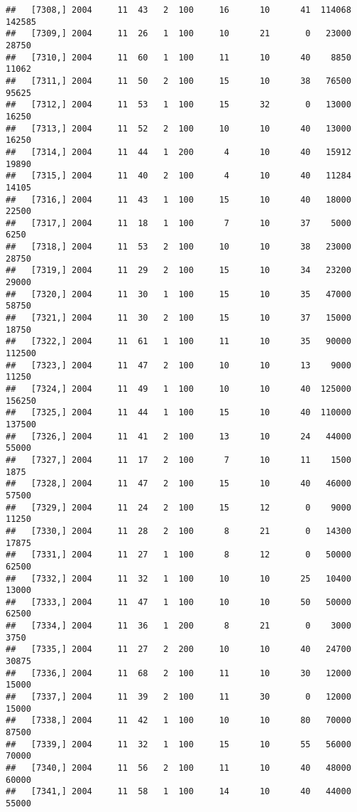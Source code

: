 \documentclass{article}\usepackage[]{graphicx}\usepackage[]{color}
\makeatletter
\newenvironment{kframe}{%
 \def\at@end@of@kframe{}%
 \ifinner\ifhmode%
  \def\at@end@of@kframe{\end{minipage}}%
  \begin{minipage}{\columnwidth}%
 \fi\fi%
 \def\FrameCommand##1{\hskip\@totalleftmargin \hskip-\fboxsep
 \colorbox{shadecolor}{##1}\hskip-\fboxsep
     \hskip-\linewidth \hskip-\@totalleftmargin \hskip\columnwidth}%
 \MakeFramed {\advance\hsize-\width
   \@totalleftmargin\z@ \linewidth\hsize
   \@setminipage}}%
 {\par\unskip\endMakeFramed%
 \at@end@of@kframe}
\newenvironment{knitrout}{}{} %
\makeatother
\begin{document}
\begin{knitrout}
\begin{kframe}
\begin{verbatim}
##   [7308,] 2004     11  43   2  100     16      10      41  114068  142585
##   [7309,] 2004     11  26   1  100     10      21       0   23000   28750
##   [7310,] 2004     11  60   1  100     11      10      40    8850   11062
##   [7311,] 2004     11  50   2  100     15      10      38   76500   95625
##   [7312,] 2004     11  53   1  100     15      32       0   13000   16250
##   [7313,] 2004     11  52   2  100     10      10      40   13000   16250
##   [7314,] 2004     11  44   1  200      4      10      40   15912   19890
##   [7315,] 2004     11  40   2  100      4      10      40   11284   14105
##   [7316,] 2004     11  43   1  100     15      10      40   18000   22500
##   [7317,] 2004     11  18   1  100      7      10      37    5000    6250
##   [7318,] 2004     11  53   2  100     10      10      38   23000   28750
##   [7319,] 2004     11  29   2  100     15      10      34   23200   29000
##   [7320,] 2004     11  30   1  100     15      10      35   47000   58750
##   [7321,] 2004     11  30   2  100     15      10      37   15000   18750
##   [7322,] 2004     11  61   1  100     11      10      35   90000  112500
##   [7323,] 2004     11  47   2  100     10      10      13    9000   11250
##   [7324,] 2004     11  49   1  100     10      10      40  125000  156250
##   [7325,] 2004     11  44   1  100     15      10      40  110000  137500
##   [7326,] 2004     11  41   2  100     13      10      24   44000   55000
##   [7327,] 2004     11  17   2  100      7      10      11    1500    1875
##   [7328,] 2004     11  47   2  100     15      10      40   46000   57500
##   [7329,] 2004     11  24   2  100     15      12       0    9000   11250
##   [7330,] 2004     11  28   2  100      8      21       0   14300   17875
##   [7331,] 2004     11  27   1  100      8      12       0   50000   62500
##   [7332,] 2004     11  32   1  100     10      10      25   10400   13000
##   [7333,] 2004     11  47   1  100     10      10      50   50000   62500
##   [7334,] 2004     11  36   1  200      8      21       0    3000    3750
##   [7335,] 2004     11  27   2  200     10      10      40   24700   30875
##   [7336,] 2004     11  68   2  100     11      10      30   12000   15000
##   [7337,] 2004     11  39   2  100     11      30       0   12000   15000
##   [7338,] 2004     11  42   1  100     10      10      80   70000   87500
##   [7339,] 2004     11  32   1  100     15      10      55   56000   70000
##   [7340,] 2004     11  56   2  100     11      10      40   48000   60000
##   [7341,] 2004     11  58   1  100     14      10      40   44000   55000

\end{verbatim}
\end{kframe}
\end{knitrout}
\end{document}

